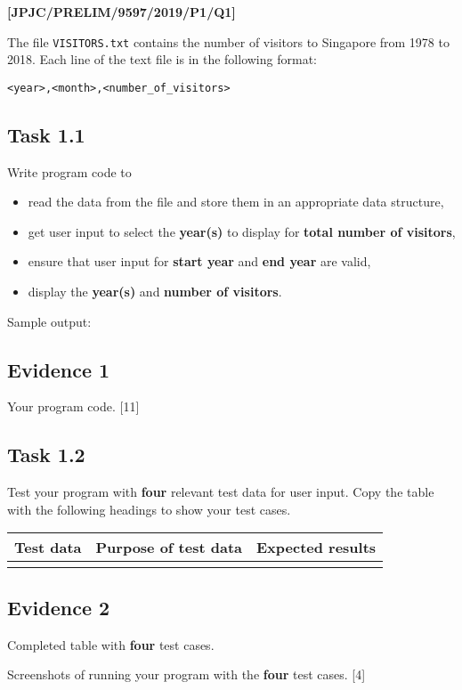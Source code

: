\item \textbf{{[}JPJC/PRELIM/9597/2019/P1/Q1{]} }

The file \texttt{VISITORS.txt} contains the number of visitors to
Singapore from 1978 to 2018. Each line of the text file is in the
following format: 
\noindent \begin{center}
\texttt{<year>,<month>,<number\_of\_visitors> }
\par\end{center}

\subsection*{Task 1.1 }

Write program code to 
\begin{itemize}
\item read the data from the file and store them in an appropriate data
structure, 
\item get user input to select the \textbf{year(s)} to display for \textbf{total
number of visitors}, 
\item ensure that user input for\textbf{ start year} and \textbf{end year}
are valid, 
\item display the \textbf{year(s)} and \textbf{number of visitors}. 
\end{itemize}
Sample output: 

\noindent{}

\subsection*{Evidence 1 }

Your program code. \hfill{}{[}11{]}

\subsection*{Task 1.2 }

Test your program with \textbf{four} relevant test data for user input.
Copy the table with the following headings to show your test cases. 
\noindent \begin{center}
\begin{tabular}{|c|c|c|}
\hline 
Test data & Purpose of test data & Expected results \tabularnewline
\hline 
 &  & \tabularnewline
\hline 
\end{tabular} 
\par\end{center}

\subsection*{Evidence 2 }

Completed table with \textbf{four} test cases. 

Screenshots of running your program with the \textbf{four} test cases.
\hfill{}{[}4{]}